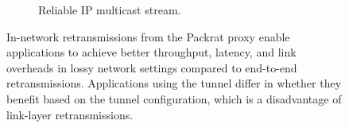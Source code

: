 \begin{figure}[t]
\begin{subfigure}[b]{0.48\linewidth}
        \caption{Reliable IP multicast stream.}
        \label{fig:packrat:perf:multicast}
    \end{subfigure}
    \caption{In-network retransmissions from the Packrat proxy enable applications
     to achieve better throughput, latency, and link
     overheads in lossy network settings compared to end-to-end
     retransmissions. Applications using the tunnel differ in whether they
     benefit based on the tunnel configuration, which is a disadvantage of
     link-layer retransmissions.}
    \label{fig:packrat:perf}
\end{figure}